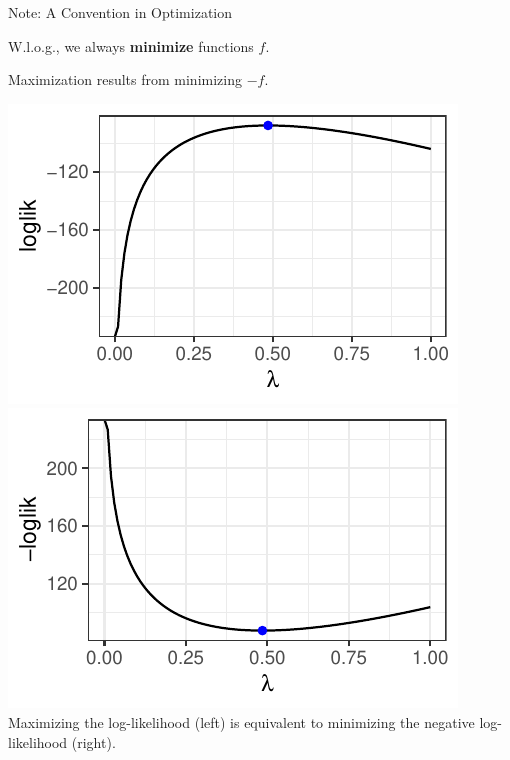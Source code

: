 
\begin{vbframe}{Note: A Convention in Optimization}

W.l.o.g., we always \textbf{minimize} functions $f$. 

\lz

Maximization results from minimizing $-f$.

\begin{center}
	\begin{footnotesize}
	\includegraphics[height=0.3\textwidth, keepaspectratio]{figure_man/ml_poisson_example_2.pdf} \includegraphics[height=0.3\textwidth, keepaspectratio]{figure_man/ml_poisson_example_3.pdf} \\
	Maximizing the log-likelihood (left) is equivalent to minimizing the negative log-likelihood (right). 
	\end{footnotesize}
\end{center}

\end{vbframe}


